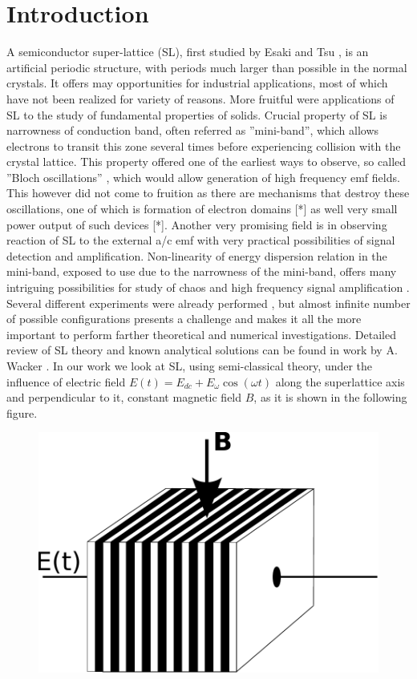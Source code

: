 \documentclass[40pt,letterpaper,physrev]{article}
\begin{document}
  \section{Introduction}  
A semiconductor super-lattice (SL), first studied by Esaki and Tsu \cite{Esaki:70}, is an artificial periodic structure, with periods
much larger than possible in the normal crystals. It offers may opportunities for industrial applications, most of which
have not been realized for variety of reasons. More fruitful were applications of SL to the study of fundamental
properties of solids. Crucial property of SL is narrowness of conduction band, often referred as ”mini-band”, which
allows electrons to transit this zone several times before experiencing collision with the crystal lattice. This property
offered one of the earliest ways to observe, so called ”Bloch oscillations” \cite{BLOCH}, which would allow generation of
high frequency emf fields. This however did not come to fruition as there are mechanisms that destroy these oscillations,
one of which is formation of electron domains [*] as well very small power output of such devices [*].
Another very promising field is in observing reaction of SL to the external a/c emf with very practical possibilities
of signal detection and amplification. Non-linearity of energy dispersion relation in the mini-band, exposed to use due
to the narrowness of the mini-band, offers many intriguing possibilities for study of chaos \cite{Alekseev2002281} and high frequency signal amplification \cite{PhysRevB.77.165330}. Several different experiments were already 
performed \cite{PhysRevB.56.10303}, but almost infinite number of possible
configurations presents a challenge and makes it all the more important to perform farther theoretical and numerical investigations.
Detailed review of SL theory and known analytical solutions can be found in work by A. Wacker \cite{WAC01}.
In our work we look at SL, using semi-classical theory, under the influence of electric field 
$E(t) = E_{dc} + E_{\omega}\cos(\omega t)$ along the superlattice axis and perpendicular to it, constant magnetic field $B$, as it
is shown in the following figure.
  	\begin{figure}[H]
	  \centering
	  \normalsize %
	  \includegraphics[scale=0.7]{illustrations/SL_CROSS_E_AND_B.pdf}
	  \caption{}
	\end{figure}
\end{document}
